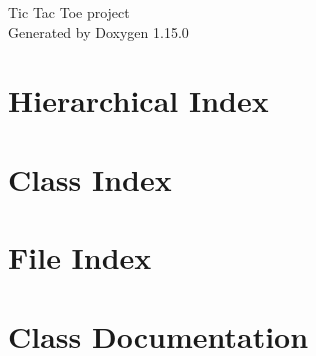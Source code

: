 \documentclass[twoside]{book}
\newcommand{\+}{\discretionary{\mbox{\scriptsize$\hookleftarrow$}}{}{}}
\newcommand{\clearemptydoublepage}{%
    \newpage{\pagestyle{empty}\cleardoublepage}%
  }
\begin{document}
  \raggedbottom
    \hypersetup{pageanchor=false,
                bookmarksnumbered=true,
                pdfencoding=unicode
               }
  \begin{titlepage}
  \vspace*{7cm}
  \begin{center}%
  {\Large Tic Tac Toe project}\\
  \vspace*{1cm}
  {\large Generated by Doxygen 1.15.0}\\
  \end{center}
  \end{titlepage}
  \clearemptydoublepage
  \tableofcontents
  \clearemptydoublepage
  \hypersetup{pageanchor=true}
\chapter{Hierarchical Index}

\chapter{Class Index}

\chapter{File Index}

\chapter{Class Documentation}




































\end{document}
